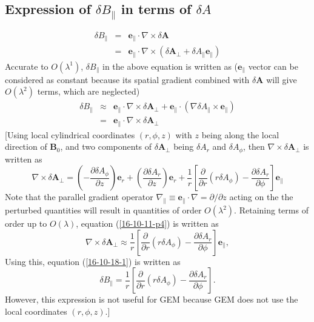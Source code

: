 \documentclass{llncs}
\begin{document}
\subsection{Expression of $\delta B_{\parallel}$ in terms of $\delta A$}

\begin{eqnarray}
  \delta B_{\parallel} & = & \mathbf{e}_{\parallel} \cdot \nabla \times \delta
  \mathbf{A} \nonumber\\
  & = & \mathbf{e}_{\parallel} \cdot \nabla \times (\delta \mathbf{A}_{\perp}
  + \delta A_{\parallel} \mathbf{e}_{\parallel}) 
\end{eqnarray}
Accurate to $O (\lambda^1)$, $\delta B_{\parallel}$ in the above equation is
written as ($\mathbf{e}_{\parallel}$ vector can be considered as constant
because its spatial gradient combined with $\delta \mathbf{A}$ will give $O
(\lambda^2)$ terms, which are neglected)
\begin{eqnarray}
  \delta B_{\parallel} & \approx & \mathbf{e}_{\parallel} \cdot \nabla \times
  \delta \mathbf{A}_{\perp} +\mathbf{e}_{\parallel} \cdot (\nabla \delta
  A_{\parallel} \times \mathbf{e}_{\parallel}) \nonumber\\
  & = & \mathbf{e}_{\parallel} \cdot \nabla \times \delta \mathbf{A}_{\perp} 
  \label{16-10-18-1}
\end{eqnarray}
[Using local cylindrical coordinates $(r, \phi, z)$ with $z$ being along the
local direction of $\mathbf{B}_0$, and two components of $\delta
\mathbf{A}_{\perp}$ being $\delta A_r$ and $\delta A_{\phi}$, then $\nabla
\times \delta \mathbf{A}_{\perp}$ is written as
\begin{equation}
  \nabla \times \delta \mathbf{A}_{\perp} = \left( - \frac{\partial \delta
  A_{\phi}}{\partial z} \right) \mathbf{e}_r + \left(  \frac{\partial \delta
  A_r}{\partial z} \right) \mathbf{e}_r + \frac{1}{r} \left[ 
  \frac{\partial}{\partial r} (r \delta A_{\phi}) - \frac{\partial \delta
  A_r}{\partial \phi} \right] \mathbf{e}_{\parallel}
\end{equation}
Note that the parallel gradient operator $\nabla_{\parallel} \equiv
\mathbf{e}_{\parallel} \cdot \nabla = \partial / \partial z$ acting on the the
perturbed quantities will result in quantities of order $O (\lambda^2)$.
Retaining terms of order up to $O (\lambda)$, equation (\ref{16-10-11-p4}) is
written as
\begin{equation}
  \nabla \times \delta \mathbf{A}_{\perp} \approx \frac{1}{r} \left[ 
  \frac{\partial}{\partial r} (r \delta A_{\phi}) - \frac{\partial \delta
  A_r}{\partial \phi} \right] \mathbf{e}_{\parallel},
\end{equation}
Using this, equation (\ref{16-10-18-1}) is written as
\begin{equation}
  \delta B_{\parallel} = \frac{1}{r} \left[  \frac{\partial}{\partial r} (r
  \delta A_{\phi}) - \frac{\partial \delta A_r}{\partial \phi} \right] .
\end{equation}
However, this expression is not useful for GEM because GEM does not use the
local coordinates $(r, \phi, z)$.]
\end{document}
